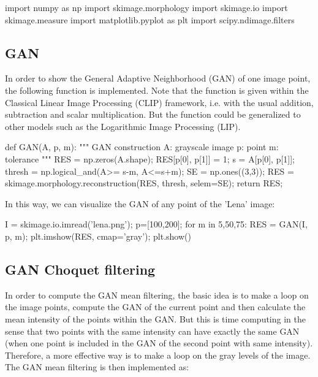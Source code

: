 \def\QRCODE{MASTER_mispa_TUT.IMG.ganip_pythonqrcode.png}
\def\QRPAGE{http://www.iptutorials.science/tree/master/MASTER_mispa/TUT.IMG.ganip/python}

\begin{python}
import numpy as np
import skimage.morphology
import skimage.io
import skimage.measure
import matplotlib.pyplot as plt
import scipy.ndimage.filters
\end{python}


\subsection{GAN}
In order to show the General Adaptive Neighborhood (GAN) of one image point, the following function is implemented.
Note that the function is given within the Classical Linear Image Processing (CLIP) framework, i.e. with the usual addition, subtraction and scalar multiplication. But the function could be generalized to other models such as the Logarithmic Image Processing (LIP).

\begin{python}
def GAN(A, p, m):
    """
    GAN construction 
    A: grayscale image
    p: point
    m: tolerance
    """
    RES = np.zeros(A.shape);
    RES[p[0], p[1]] = 1;
    s = A[p[0], p[1]];
    thresh = np.logical_and(A>= s-m, A<=s+m);
    SE = np.ones((3,3));
    RES = skimage.morphology.reconstruction(RES, thresh, selem=SE);
    return RES;
\end{python}

\noindent In this way, we can visualize the GAN of any point of the 'Lena' image: 
\begin{python}
I = skimage.io.imread('lena.png');
p=[100,200];
for m in 5,50,75:
    RES = GAN(I, p, m);
    plt.imshow(RES, cmap='gray');
    plt.show()
\end{python}



\subsection{GAN Choquet filtering}
In order to compute the GAN mean filtering, the basic idea is to make a loop on the image points, compute the GAN of the current point and then calculate the mean intensity of the points within the GAN. But this is time computing in the sense that two points with the same intensity can have exactly the same GAN (when one point is included in the GAN of the second point with same intensity). Therefore, a more effective way is to make a loop on the gray levels of the image.
The GAN mean filtering is then implemented as:

